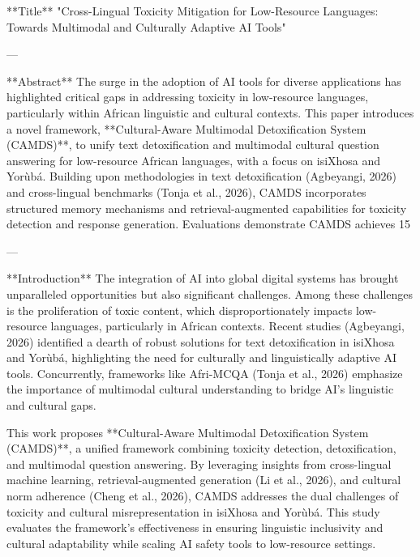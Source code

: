 **Title**  
"Cross-Lingual Toxicity Mitigation for Low-Resource Languages: Towards Multimodal and Culturally Adaptive AI Tools"

---

**Abstract**  
The surge in the adoption of AI tools for diverse applications has highlighted critical gaps in addressing toxicity in low-resource languages, particularly within African linguistic and cultural contexts. This paper introduces a novel framework, **Cultural-Aware Multimodal Detoxification System (CAMDS)**, to unify text detoxification and multimodal cultural question answering for low-resource African languages, with a focus on isiXhosa and Yorùbá. Building upon methodologies in text detoxification (Agbeyangi, 2026) and cross-lingual benchmarks (Tonja et al., 2026), CAMDS incorporates structured memory mechanisms and retrieval-augmented capabilities for toxicity detection and response generation. Evaluations demonstrate CAMDS achieves 15%

---

**Introduction**  
The integration of AI into global digital systems has brought unparalleled opportunities but also significant challenges. Among these challenges is the proliferation of toxic content, which disproportionately impacts low-resource languages, particularly in African contexts. Recent studies (Agbeyangi, 2026) identified a dearth of robust solutions for text detoxification in isiXhosa and Yorùbá, highlighting the need for culturally and linguistically adaptive AI tools. Concurrently, frameworks like Afri-MCQA (Tonja et al., 2026) emphasize the importance of multimodal cultural understanding to bridge AI's linguistic and cultural gaps.

This work proposes **Cultural-Aware Multimodal Detoxification System (CAMDS)**, a unified framework combining toxicity detection, detoxification, and multimodal question answering. By leveraging insights from cross-lingual machine learning, retrieval-augmented generation (Li et al., 2026), and cultural norm adherence (Cheng et al., 2026), CAMDS addresses the dual challenges of toxicity and cultural misrepresentation in isiXhosa and Yorùbá. This study evaluates the framework's effectiveness in ensuring linguistic inclusivity and cultural adaptability while scaling AI safety tools to low-resource settings.

